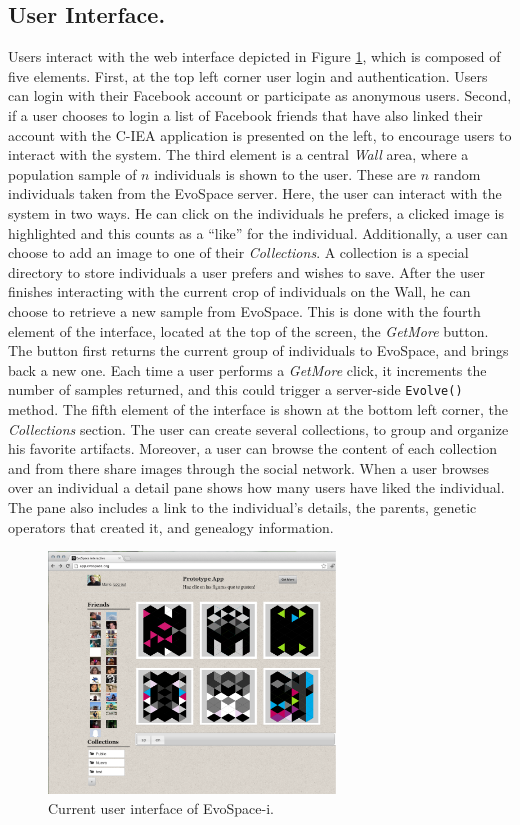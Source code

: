 \documentclass{sig-alternate}
\begin{document}
\subsection{User Interface.}
Users interact with the web interface depicted in Figure \ref{fig:web}, which is composed of five elements.
First, at the top left corner user login and authentication.
Users can login with their Facebook account or participate as anonymous users.
Second, if a user chooses to login a list of Facebook friends that have also linked their account with the C-IEA application is presented on the left, to encourage users to interact with the system. The third element is a central \emph{ Wall } area, where a population sample of $n$ individuals is shown to the user.
These are $n$ random individuals taken from the EvoSpace server.
Here, the user can interact with the system in two ways.
He can click on the individuals he prefers, a clicked image is highlighted and this counts as a ``like'' for the individual.
Additionally, a user can choose to add an image to one of their \emph{Collections}.
A collection is a special directory to store individuals a user prefers and wishes to save. After the user finishes interacting with the current crop of individuals on the Wall, he can choose to retrieve a new sample from EvoSpace.
This is done with the fourth element of the interface, located at the top of the screen, the \emph{GetMore} button.
The button first returns the current group of individuals to EvoSpace, and brings back a new one.
Each time a user performs a \emph{GetMore} click, it increments the number of samples returned, and this could  trigger a server-side \texttt{Evolve()} method. The fifth element of the interface is shown at the bottom left corner, the \emph{Collections} section.
The user can create several collections, to group and organize his favorite artifacts.
Moreover, a user can browse the content of each collection and from there share images through the social network.
When a user browses over an individual a detail pane shows how many users have liked the individual.
The pane also includes a link to the individual's details, the parents, genetic operators that created it, and genealogy information.


\begin{figure}[!t]
    \centering
        \includegraphics[width=3in]{EvoApp.eps}
    \caption{Current user interface of EvoSpace-i.}
    \label{fig:web}
\end{figure}
\end{document}

